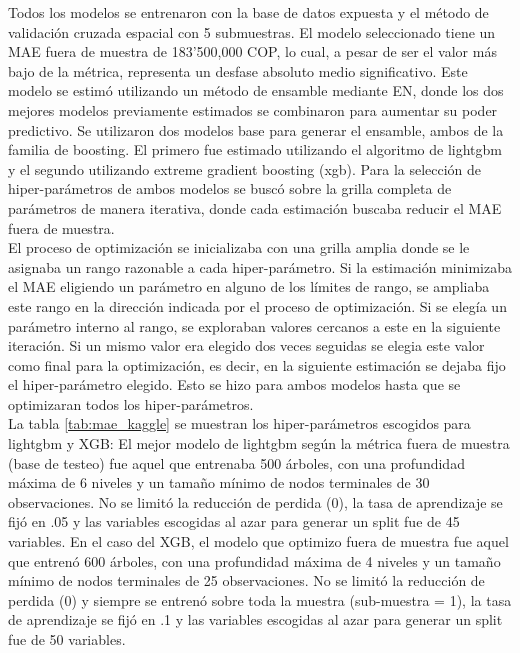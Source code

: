 \documentclass[10pt]{article}
\begin{document}


Todos los modelos se entrenaron con la base de datos expuesta y el método de validación cruzada espacial con 5 submuestras. El modelo seleccionado tiene un MAE fuera de muestra de 183’500,000 COP, lo cual, a pesar de ser el valor más bajo de la métrica, representa un desfase absoluto medio significativo. Este modelo se estimó utilizando un método de ensamble mediante EN, donde los dos mejores modelos previamente estimados se combinaron para aumentar su poder predictivo. Se utilizaron dos modelos base para generar el ensamble, ambos de la familia de boosting. El primero fue estimado utilizando el algoritmo de lightgbm y el segundo utilizando extreme gradient boosting (xgb). Para la selección de hiper-parámetros de ambos modelos se buscó sobre la grilla completa de parámetros de manera iterativa, donde cada estimación buscaba reducir el MAE fuera de muestra.  \\

El proceso de optimización se inicializaba con una grilla amplia donde se le asignaba un rango razonable a cada hiper-parámetro. Si la estimación minimizaba el MAE eligiendo un parámetro en alguno de los límites de rango, se ampliaba este rango en la dirección indicada por el proceso de optimización. Si se elegía un parámetro interno al rango, se exploraban valores cercanos a este en la siguiente iteración. Si un mismo valor era elegido dos veces seguidas se elegia este valor como final para la optimización, es decir, en la siguiente estimación se dejaba fijo el hiper-parámetro elegido. Esto se hizo para ambos modelos hasta que se optimizaran todos los hiper-parámetros. \\

La tabla \ref{tab:mae_kaggle} se muestran los hiper-parámetros escogidos para lightgbm y XGB:
El mejor modelo de lightgbm según la métrica fuera de muestra (base de testeo) fue aquel que entrenaba 500 árboles, con una profundidad máxima de 6 niveles y un tamaño mínimo de nodos terminales de 30 observaciones. No se limitó la reducción de perdida (0), la tasa de aprendizaje se fijó en .05 y las variables escogidas al azar para generar un split fue de 45 variables. En el caso del XGB, el modelo que optimizo fuera de muestra fue aquel que entrenó 600 árboles, con una profundidad máxima de 4 niveles y un tamaño mínimo de nodos terminales de 25 observaciones. No se limitó la reducción de perdida (0) y siempre se entrenó sobre toda la muestra (sub-muestra = 1), la tasa de aprendizaje se fijó en .1 y las variables escogidas al azar para generar un split fue de 50 variables. \\
\end{document}
